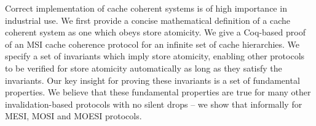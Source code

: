 Correct implementation of cache coherent systems is of high importance in
industrial use. We first provide a concise mathematical definition of a cache
coherent system as one which obeys store atomicity. We give a Coq-based proof
of an MSI cache coherence protocol for an infinite set of cache hierarchies. We
specify a set of invariants which imply store atomicity, enabling other
protocols to be verified for store atomicity automatically as long as they
satisfy the invariants. Our key insight for proving these invariants is a set
of fundamental properties.  We believe that these fundamental properties are
true for many other invalidation-based protocols with no silent drops -- we
show that informally for MESI, MOSI and MOESI protocols.


